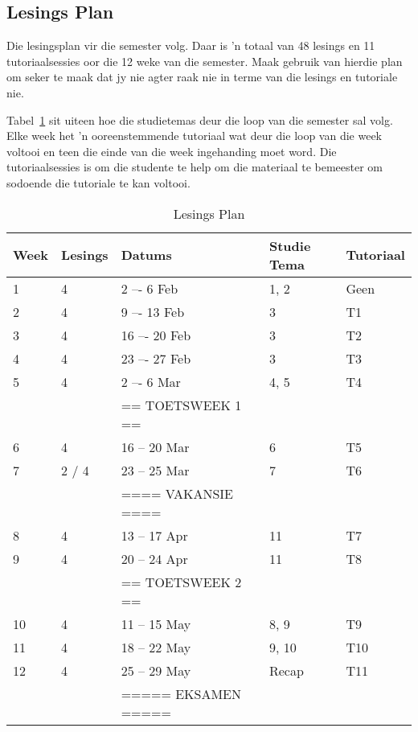     \subsection{Lesings Plan}
        Die lesingsplan vir die semester volg.  Daar is 'n totaal van 48
        lesings en 11 tutoriaalsessies oor die 12 weke van die semester. Maak
        gebruik van hierdie plan om seker te maak dat jy nie agter raak nie in
        terme van die lesings en tutoriale nie.

        Tabel~\ref{tab:lec_plan} sit uiteen hoe die studietemas deur die loop
        van die semester sal volg.  Elke week het 'n ooreenstemmende tutoriaal
        wat deur die loop van die week voltooi en teen die	einde van die week
        ingehanding moet word. Die tutoriaalsessies is om die studente te help
        om die materiaal te bemeester om sodoende die tutoriale te kan voltooi.

        \begin{table}[!h]
            \begin{center}
             \begin{tabular}{|l|l|l|l|l|}
                 \hline
                 {\bf Week} & {\bf Lesings} & {\bf Datums} & {\bf Studie Tema}
                 & {\bf Tutoriaal} \\
                 \hline
                 1  & 4     &  2 –-  6 Feb        & 1, 2  & Geen \\
                 2  & 4     &  9 –- 13 Feb        & 3     & T1 \\
                 3  & 4     & 16 –- 20 Feb        & 3     & T2 \\
                 4  & 4     & 23 –- 27 Feb        & 3     & T3 \\
                 5  & 4     &  2 –-  6 Mar        & 4, 5  & T4 \\
                    &       & == TOETSWEEK 1 ==   &       & \\
                 6  & 4     & 16 -- 20 Mar        & 6     & T5 \\
                 7  & 2 / 4 & 23 -- 25 Mar        & 7     & T6 \\
                    &       & ==== VAKANSIE ====  &       & \\
                 8  & 4     & 13 -- 17 Apr        & 11    & T7 \\
                 9  & 4     & 20 -- 24 Apr        & 11    & T8 \\
                    &       & == TOETSWEEK 2 ==   &       & \\
                 10 & 4     & 11 -- 15 May        & 8, 9  & T9 \\
                 11 & 4     & 18 -- 22 May        & 9, 10 & T10 \\
                 12 & 4     & 25 -- 29 May        & Recap & T11 \\
                    &       & ===== EKSAMEN ===== &       & \\
                 \hline
             \end{tabular}
             \caption{Lesings Plan} \label{tab:lec_plan}
            \end{center}
        \end{table}


